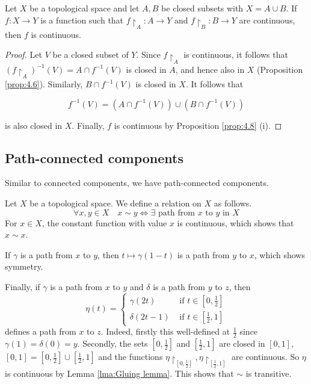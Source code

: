 \documentclass[a4paper]{article}
\begin{document}
\begin{lemma}\label{lma:Gluing lemma}
    Let $X$ be a topological space and let $A, B$ be closed subsets with $X=A \cup B$. If $f: X \rightarrow Y$ is a function such that $f\restriction_{A}: A \rightarrow Y$ and $f\restriction_{B}: B \rightarrow Y$ are continuous, then $f$ is continuous.
\end{lemma}

\begin{proof}
    Let $V$ be a closed subset of $Y$. Since $f\restriction_{A}$ is continuous, it follows that $\left(f\restriction_{A}\right)^{-1}(V)=A \cap f^{-1}(V)$ is closed in $A$, and hence also in $X$ (Proposition \ref{prop:4.6}). Similarly, $B \cap f^{-1}(V)$ is closed in $X$. It follows that

$$
f^{-1}(V)=\left(A \cap f^{-1}(V)\right) \cup\left(B \cap f^{-1}(V)\right)
$$

is also closed in $X$. Finally, $f$ is continuous by Proposition \ref{prop:4.8} (i).
\end{proof}

\subsection{Path-connected components}
Similar to connected components, we have path-connected components.

Let $X$ be a topological space. We define a relation on $X$ as follows.
$$
\forall x, y \in X \quad x \sim y \Longleftrightarrow \exists \text { path from } x \text { to } y \text { in } X
$$
For $x \in X$, the constant function with value $x$ is continuous, which shows that $x \sim x$. 

If $\gamma$ is a path from $x$ to $y$, then $t \mapsto \gamma(1-t)$ is a path from $y$ to $x$, which shows symmetry. 

Finally, if $\gamma$ is a path from $x$ to $y$ and $\delta$ is a path from $y$ to $z$, then
$$
\eta(t)= \begin{cases}\gamma(2 t) & \text { if } t \in\left[0, \frac{1}{2}\right] \\ \delta(2 t-1) & \text { if } t \in\left[\frac{1}{2}, 1\right]\end{cases}
$$
defines a path from $x$ to $z$. Indeed, firstly this well-defined at $\frac{1}{2}$ since
$\gamma(1)=\delta(0)=y$. Secondly, the sets $\left[0, \frac{1}{2}\right]$ and $\left[\frac{1}{2}, 1\right]$ are closed in $[0,1]$, $[0,1]=\left[0, \frac{1}{2}\right] \cup\left[\frac{1}{2}, 1\right]$ and the functions $\eta\restriction_{\left[0, \frac{1}{2}\right]}, \eta \restriction_{\left[\frac{1}{2}, 1\right]}$ are continuous. So $\eta$ is continuous by Lemma \ref{lma:Gluing lemma}. This shows that $\sim$ is transitive.
\end{document}
